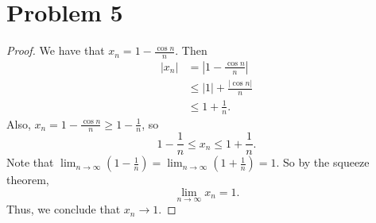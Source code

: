\documentclass{article}
\begin{document}
\section*{Problem 5}
\begin{proof}
	We have that $x_n = 1 - \frac{\cos{n}}{n}$. Then 
	\begin{align}
		|x_n| &= |1-\frac{\cos{n}}{n}| \\
		& \leq |1| + \frac{|\cos{n}|}{n} \\
		& \leq 1 + \frac{1}{n}.
	\end{align}
	Also, $x_n = 1 - \frac{\cos{n}}{n} \geq 1 - \frac{1}{n}$, so
	\begin{equation}
		1-\frac{1}{n} \leq x_n \leq 1 + \frac{1}{n}.
	\end{equation}
	Note that $\lim_{n\to\infty}(1 - \frac{1}{n}) = \lim_{n\to\infty}(1 + \frac{1}{n}) = 1$. So by the squeeze theorem, 
	\begin{equation}
		\lim_{n\to\infty}x_n = 1.
	\end{equation}
	Thus, we conclude that $x_n \rightarrow 1$.	
\end{proof}
\end{document}

